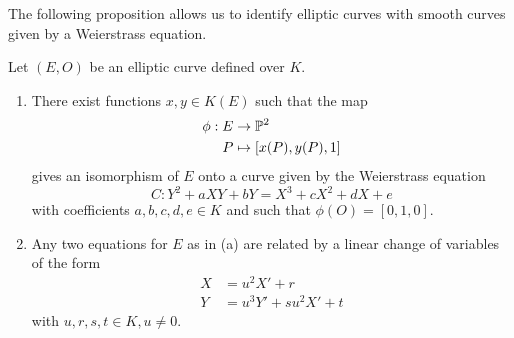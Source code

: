 The following proposition allows us to identify elliptic curves
with smooth curves given by a Weierstrass equation.
\begin{proposition}
	\label{prop:curve-correspondence}
	Let $(E, O)$ be an elliptic curve defined over $K$.
	\begin{enumerate}[itemsep=0em, label=(\alph*)]
		\item There exist functions $x, y \in K(E)$ such that the map
			\begin{align*}
				\phi: E &\to \mathbb{P}^2\\
				P &\mapsto [x(P), y(P), 1]
			\end{align*}
			gives an isomorphism of $E$  onto a curve given by 
			the Weierstrass equation
			\begin{equation*}
				C: Y^2 + aXY + bY = X^3 + cX^2 + dX + e
			\end{equation*}
			with coefficients $a, b, c, d, e \in K$ and such that $\phi(O) =
			[0,1, 0]$.
		\item Any two equations for $E$ as in (a) are related by a linear change
			of variables of the form
			\begin{align*}
				X &= u^2X' + r\\
				Y &= u^3Y' + su^2X' + t
			\end{align*}
			with $u, r, s, t \in K, u \neq 0$.
	\end{enumerate}
\end{proposition}

